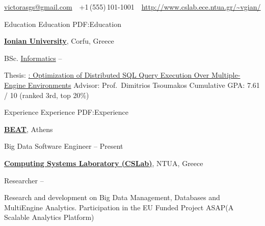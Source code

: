 \documentclass[letterpaper,MMMyyyy,nonstopmode]{simpleresumecv}
\newcommand{\CVAuthor}{Victor Giannakouris}
\begin{document}

\Title{\CVAuthor}

\begin{SubTitle}
\par
\href{mailto:victorasgs@gmail.com}
{victorasgs@gmail.com}
\,\SubBulletSymbol\,
+1\,(555)\,101-1001
\,\SubBulletSymbol\,
\href{http://www.cslab.ece.ntua.gr/~vgian/}
{\url{http://www.cslab.ece.ntua.gr/~vgian/}}
\end{SubTitle}

\begin{Body}


\Section
{Education}
{Education}
{PDF:Education}

\Entry
\href{http://www.ionio.gr}
{\textbf{Ionian University}},
Corfu, Greece

\Gap
\BulletItem
BSc.
\href{http://di.ionio.gr}
{Informatics}
\hfill
{} --
\begin{Detail}
\SubBulletItem
Thesis:
\href{http://www.cslab.ece.ntua.gr/~vgian/papers/thesis.pdf}
{: Optimization of Distributed SQL Query Execution Over Multiple-Engine Environments}
\SubBulletItem
Advisor:
Prof.~Dimitrios Tsoumakos
\SubBulletItem
Cumulative GPA: 7.61 / 10 (ranked 3rd, top 20\%)
\end{Detail}


\Section
{Experience}
{Experience}
{PDF:Experience}

\Entry
\href{http://taxibeat.gr}
{\textbf{BEAT}}, Athens

\Gap
\BulletItem
Big Data Software Engineer
\hfill
{} --
Present
\begin{Detail}
\end{Detail}

\Entry
\href{http://cslab.ece.ntua.gr}
{\textbf{Computing Systems Laboratory (CSLab)}},
NTUA, Greece

\Gap
\BulletItem
Researcher
\hfill
{} --
\begin{Detail}
	\SubBulletItem
	Research and development on Big Data Management, Databases and MultiEngine
	Analytics. 
	\SubBulletItem
	Participation in the EU Funded Project ASAP(A Scalable Analytics
	Platform)
\end{Detail}


\end{Body}
\end{document}

